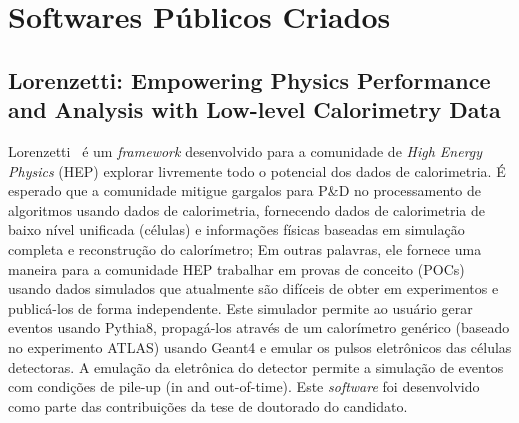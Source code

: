 \section{Softwares Públicos Criados}


\subsection{Lorenzetti: Empowering Physics Performance and Analysis with Low-level Calorimetry Data}

Lorenzetti~\cite{Araujo:2023uwq} é um \emph{framework} desenvolvido para a comunidade de \emph{High Energy Physics} (HEP) explorar livremente todo o potencial dos dados de calorimetria. É esperado que a comunidade mitigue gargalos para P\&D no processamento de algoritmos usando dados de calorimetria, fornecendo dados de calorimetria de baixo nível unificada (células) e informações físicas baseadas em simulação completa e reconstrução do calorímetro; Em outras palavras, ele fornece uma maneira para a comunidade HEP trabalhar em provas de conceito (POCs) usando dados simulados que atualmente são difíceis de obter em experimentos e publicá-los de forma independente. Este simulador permite ao usuário gerar eventos usando Pythia8, propagá-los através de um calorímetro genérico (baseado no experimento ATLAS) usando Geant4 e emular os pulsos eletrônicos das células detectoras. A emulação da eletrônica do detector permite a simulação de eventos com condições de pile-up (in and out-of-time). Este \emph{software} foi desenvolvido como parte das contribuições da tese de doutorado do candidato.
    

\nocite{*}
\renewcommand{\bibsection}{}
\printbibliography[keyword={software},heading=none]


